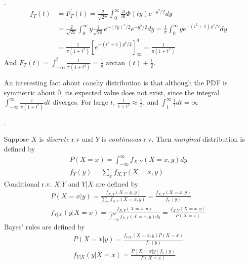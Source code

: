 \documentclass[8pt]{beamer}
\newcommand{\ti}[1]{\textit{#1}}
\begin{document}
\begin{frame}{.}
    \[
    \begin{aligned}
        f_T(t) &= F_T^\prime(t) = \frac{2}{\sqrt{2\pi}} \int_0^\infty \frac{\partial}{\partial t} \Phi(ty) e^{-y^2/2} dy \\
        &=  \frac{2}{\sqrt{2\pi}} \int_0^\infty y \frac{1}{\sqrt{2\pi}}e^{-(ty)^2/2} e^{-y^2/2} dy = \frac{1}{\pi} \int_0^\infty y e^{-(t^2 +1)y^2/2} dy \\
        &= \frac{1}{\pi (1+t^2)} \left[ e^{-(t^2 +1)y^2/2} \right]^0_\infty = \frac{1}{\pi (1+t^2)}
    \end{aligned}
    \]
    And $F_T(t) = \int_{-\infty}^t \frac{1}{\pi(1+t^2)} = \frac{1}{\pi} \operatorname{arctan}(t) + \frac{1}{2}$.

    An interesting fact about cauchy distribution is that although the PDF is symmetric about $0$, its expected value does not exist, since the integral $\int_{-\infty}^\infty \frac{t}{\pi(1+t^2)}dt$ diverges. For large $t$, $\frac{t}{1+t^2} \approx \frac{1}{t}$, and $\int^\infty_1 \frac{1}{t} dt = \infty$

\end{frame}

\begin{frame}{.}

    Suppose $X$ is \ti{discrete} r.v and $Y$ is \ti{continuous} r.v. Then \ti{marginal} distribution is defined by
    \[
        \begin{gathered}
            P(X=x) = \int_{-\infty}^\infty f_{X,Y}(X=x,y) dy\\
            f_Y(y) = \sum_x f_{X,Y}(X=x,y)
        \end{gathered}
    \]
    Conditional r.v. $X|Y$ and $Y|X$ are defined by
    \[
        \begin{gathered}
            P(X=x|y) = \frac{f_{X,Y}(X=x,y)}{\sum_x f_{X,Y} (X=x, y)} = \frac{f_{X,Y} (X=x,y)}{f_Y(y)} \\
            f_{Y|X} (y|X=x) = \frac{f_{X,Y}(X=x,y)}{\int_{-\infty}^\infty f_{X,Y}(X=x,y) dy} = \frac{f_{X,Y}(X=x,y)}{P(X=x)}
        \end{gathered}
    \]
    Bayes' rules are defined by 
    \[
        \begin{gathered}
            P(X=x|y) = \frac{f_{Y|X}(X=x,y) P(X=x)}{f_Y(y)}\\
            f_{Y|X}(y|X=x) = \frac{P(X=x|y)f_Y(y)}{P(X=x)}
        \end{gathered}
    \]
\end{frame}
\end{document}
